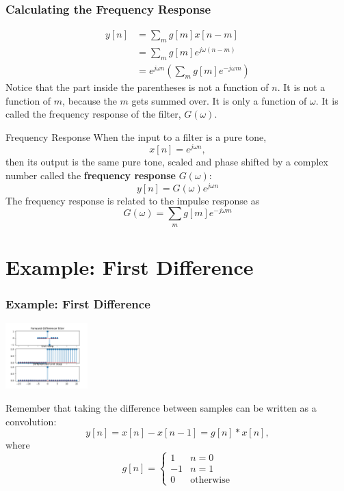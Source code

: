 \documentclass{beamer}
\begin{document}
\begin{frame}
  \frametitle{Calculating the Frequency Response}

  
  \begin{align*}
    y[n] &= \sum_m g[m] x[n-m]\\
    &= \sum_m g[m] e^{j\omega (n-m)}\\
    &= e^{j\omega n} \left(\sum_m g[m] e^{-j\omega m}\right)
  \end{align*}
  Notice that the part inside the parentheses is not a function of
  $n$.  It is not a function of $m$, because the $m$ gets summed over.
  It is only a function of $\omega$.  It is called the frequency
  response of the filter, $G(\omega)$.
\end{frame}

\begin{frame}
  \begin{block}{Frequency Response}
    When the input to a filter is a pure tone,
    \[
    x[n] =e^{j\omega n},
    \]
    then its output is the same pure tone, scaled and phase shifted by  a  complex number
    called the {\bf frequency response} $G(\omega)$:
    \[
    y[n] = G(\omega) e^{j\omega n}
    \]
    The frequency response is related to the impulse response as
    \[
    G(\omega) = \sum_m g[m]e^{-j\omega m}
    \]
  \end{block}
\end{frame}

\section[Example]{Example: First Difference}
\setcounter{subsection}{1}

\begin{frame}
  \frametitle{Example: First Difference}

  \centerline{\includegraphics[height=1in]{../lec02/mp1fig5.png}}
  
  Remember that taking the difference between samples can be written as a convolution:
  \[ y[n] = x[n]-x[n-1]= g[n]\ast x[n],\]
  where
  \[
  g[n]=\begin{cases}1 & n=0\\-1&n=1\\0&\mbox{otherwise}\end{cases}
  \]
\end{frame}
\end{document}
